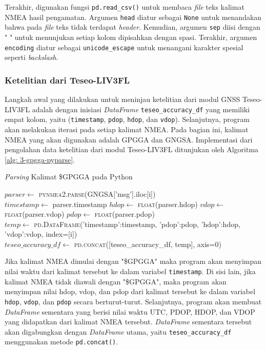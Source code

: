 Terakhir, digunakan fungsi \texttt{pd.read\_csv()} untuk membaca \textit{file} teks kalimat NMEA hasil pengamatan. Argumen \texttt{head} diatur sebagai \texttt{None} untuk menandakan bahwa pada \textit{file} teks tidak terdapat \textit{header}. Kemudian, argumen \texttt{sep} diisi dengan " 
" untuk menunjukan setiap kolom dipisahkan dengan spasi. Terakhir, argumen \texttt{encoding} diatur sebagai \texttt{unicode\_escape} untuk menangani karakter spesial seperti \textit{backslash}.

\subsubsection{Ketelitian dari Teseo\hyp{}LIV3FL}
Langkah awal yang dilakukan untuk meninjau ketelitian dari modul GNSS Teseo\hyp{}LIV3FL adalah dengan inisiasi \textit{DataFrame} \texttt{teseo\_accuracy\_df} yang memiliki empat kolom, yaitu (\texttt{timestamp}, \texttt{pdop}, \texttt{hdop}, dan \texttt{vdop}). Selanjutnya, program akan melakukan iterasi pada setiap kalimat NMEA. Pada bagian ini, kalimat NMEA yang akan digunakan adalah GPGGA dan GNGSA. Implementasi dari pengolahan data ketelitian dari modul Teseo\hyp{}LIV3FL ditunjukan oleh Algoritma \ref{alg: 3-gpgga-pyparse}.

\begin{algorithm}[H]
	\caption{\textit{Parsing} Kalimat \$GPGGA pada Python}
	\label{alg: 3-gpgga-pyparse}
	\begin{algorithmic}[1]
		\State $parser \gets$ \textsc{pynmea2.parse}(GNGSA['msg'].iloc[i])
		\\
		\State $timestamp \gets$ parser.timestamp
		\Else
		\State $hdop \gets$ \textsc{float}(parser.hdop)
		\State $vdop \gets$ \textsc{float}(parser.vdop)
		\State $pdop \gets$ \textsc{float}(parser.pdop)
		\\
		\State $temp \gets$ \textsc{pd.DataFrame}({'timestamp':timestamp, 'pdop':pdop, 'hdop':hdop, 'vdop':vdop}, index=[i])
		\\
		\State $teseo\_accuracy\_df \gets$ \textsc{pd.concat}([teseo\_accuracy\_df, temp], axis=0)
		\EndIf
	\EndFor		
	\end{algorithmic}
\end{algorithm}

Jika kalimat NMEA dimulai dengan "\$GPGGA" maka program akan menyimpan nilai waktu dari kalimat tersebut ke dalam variabel \texttt{timestamp}. Di sisi lain, jika kalimat NMEA tidak diawali dengan "\$GPGGA", maka program akan menyimpan nilai hdop, vdop, dan pdop dari kalimat tersebut ke dalam variabel \texttt{hdop}, \texttt{vdop}, dan \texttt{pdop} secara berturut-turut. Selanjutnya, program akan membuat \textit{DataFrame} sementara yang berisi nilai waktu UTC, PDOP, HDOP, dan VDOP yang didapatkan dari kalimat NMEA tersebut. \textit{DataFrame} sementara tersebut akan digabungkan dengan \textit{DataFrame} utama, yaitu \texttt{teseo\_accuracy\_df} menggunakan metode \texttt{pd.concat()}.

